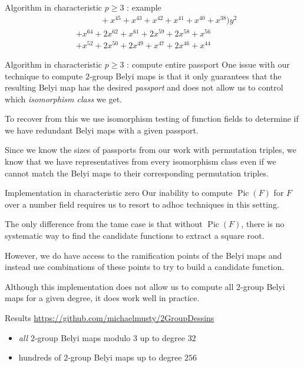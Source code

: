 \documentclass[xcolor=dvipsnames]{beamer}
\theoremstyle{plain}
\DeclareMathOperator{\Pic}{Pic}
\begin{document}
{\begin{frame}{Algorithm in characteristic $p\geq 3$ : example}
\begin{align*}
        &\;\;\;\;\;\;\;\;\;\;\,+ x^{45} + x^{43} + x^{42} + x^{41} + x^{40} + x^{38})y^2\\
        &+ x^{64} + 2x^{62} + x^{61} + 2x^{59} + 2x^{58} + x^{56}\\
        &+ x^{52} + 2x^{50} + 2x^{49} + x^{47} + 2x^{46} + x^{44}
      \end{align*}
    \end{frame}
    \begin{frame}{Algorithm in characteristic $p\geq 3$ : compute entire passport}
      One issue with our technique
      to compute $2$-group Belyi maps
      is that it only guarantees that the
      resulting Belyi map has the desired
      \emph{passport} and does not allow us
      to control which \emph{isomorphism class} we get.
      \pause\par
      To recover from this we use isomorphism testing
      of function fields to determine if we have
      redundant Belyi maps with a given passport.
      \pause\par
      Since we know the sizes of passports from our
      work with permutation triples,
      we know that we have representatives from
      every isomorphism class
      even if we cannot match the Belyi maps
      to their corresponding permutation triples.
    \end{frame}
    \begin{frame}{Implementation in characteristic zero}
      Our inability to compute $\Pic(F)$
      for $F$ over a number field requires
      us to resort to adhoc techniques in this setting.
      \pause\par
      The only difference from the tame case is that
      without $\Pic(F)$, there is no systematic way
      to find the candidate functions to extract
      a square root.
      \pause\par
      However, we do have access to the ramification points
      of the Belyi maps and instead use combinations
      of these points to try to build a candidate function.
      \pause\par
      Although this implementation does not allow us
      to compute all $2$-group Belyi maps for a given
      degree, it does work well in practice.
    \end{frame}
    \begin{frame}{Results}
        \url{https://github.com/michaelmusty/2GroupDessins}
      \begin{itemize}
        \item
          \emph{all} $2$-group Belyi maps modulo $3$ up to degree $32$
        \item
          hundreds of $2$-group Belyi maps up to degree $256$
      \end{itemize}
    \end{frame}
  }
\end{document}
